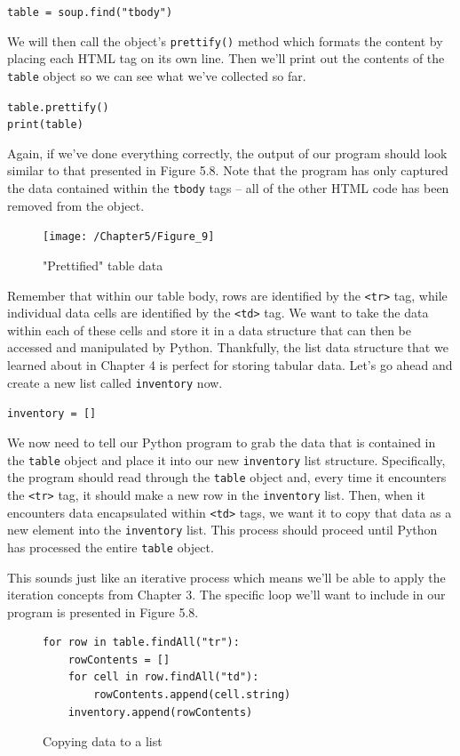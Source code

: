 \documentclass{book}
\begin{document}
	\texttt{table = soup.find("tbody")}
	
	We will then call the object's \texttt{prettify()} method which formats the content by placing each HTML tag on its own line. Then we'll print out the contents of the \texttt{table} object so we can see what we've collected so far.
	
	\texttt{table.prettify()} \\
	\texttt{print(table)}
	
	Again, if we've done everything correctly, the output of our program should look similar to that presented in Figure 5.8. Note that the program has only captured the data contained within the \texttt{tbody} tags -- all of the other HTML code has been removed from the object.
		
\begin{figure}[h]
	\caption{"Prettified" table data}
	\centering\texttt{[image: /Chapter5/Figure\_9]}
\end{figure}

	Remember that within our table body, rows are identified by the \texttt{<tr>} tag, while individual data cells are identified by the \texttt{<td>} tag. We want to take the data within each of these cells and store it in a data structure that can then be accessed and manipulated by Python. Thankfully, the list data structure that we learned about in Chapter 4 is perfect for storing tabular data. Let's go ahead and create a new list called \texttt{inventory} now.
	
	\texttt{inventory = []}
	
	We now need to tell our Python program to grab the data that is contained in the \texttt{table} object and place it into our new \texttt{inventory} list structure. Specifically, the program should read through the \texttt{table} object and, every time it encounters the \texttt{<tr>} tag, it should make a new row in the \texttt{inventory} list. Then, when it encounters data encapsulated within \texttt{<td>} tags, we want it to copy that data as a new element into the \texttt{inventory} list. This process should proceed until Python has processed the entire \texttt{table} object.
	
	This sounds just like an iterative process which means we'll be able to apply the iteration concepts from Chapter 3. The specific loop we'll want to include in our program is presented in Figure 5.8.

\begin{figure}[h]
\caption{Copying data to a list}
\begin{lstlisting}
for row in table.findAll("tr"):
	rowContents = []
	for cell in row.findAll("td"):
		rowContents.append(cell.string)
	inventory.append(rowContents)
\end{lstlisting}
\end{figure}	
\end{document}
